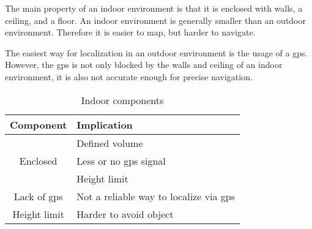 The main property of an indoor environment is that it is enclosed with walls, a ceiling, and a floor. An indoor environment is generally smaller than an outdoor environment. Therefore it is easier to map, but harder to navigate.

The easiest way for localization in an outdoor environment is the usage of a \acs{gps}. However, the \acs{gps} is not only blocked by the walls and ceiling of an indoor environment, it is also not accurate enough for precise navigation.

\begin{table}[!h]
  \centering
  \begin{tabular}{| c | l |}
    \hline
    \textbf{Component} & \textbf{Implication}\\
    \hline
    \multirow{3}{*}{Enclosed} & Defined volume\\
    & Less or no \acs{gps} signal\\
    & Height limit\\
    \hline
    Lack of \acs{gps} & Not a reliable way to localize via \acs{gps}\\
    \hline
    Height limit & Harder to avoid object\\
    \hline
  \end{tabular}
  \caption{Indoor components}
\end{table}